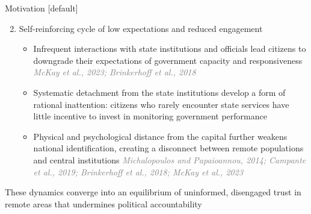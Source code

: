 \documentclass[10pt]{beamer}
\begin{document}
\begin{frame}{Motivation}
    [default]

    \begin{enumerate}
        \setcounter{enumi}{1}
        \item Self-reinforcing cycle of low expectations and reduced engagement
        \begin{itemize}\setlength\itemsep{1em}
            \vspace{0.5em}
            \item Infrequent interactions with state institutions and officials lead citizens to downgrade their expectations
            of government capacity and responsiveness \textcolor{gray}{\textit{McKay et al., 2023; Brinkerhoff et al., 2018}}   \pause
            \item Systematic detachment from the state institutions develop
            a form of rational inattention: citizens who rarely encounter state services have little
            incentive to invest in monitoring government performance   \pause
            \item Physical and psychological
            distance from the capital further weakens national identification, creating a disconnect between
            remote populations and central institutions \textcolor{gray}{\textit{Michalopoulos and Papaioannou, 2014;
            Campante et al., 2019; Brinkerhoff et al., 2018; McKay et al., 2023}}\vfill   \pause
        \end{itemize}
    \end{enumerate}

    \centering These dynamics converge into an equilibrium of uninformed, disengaged trust in remote areas that undermines political accountability \vfill
\end{frame}
\end{document}
